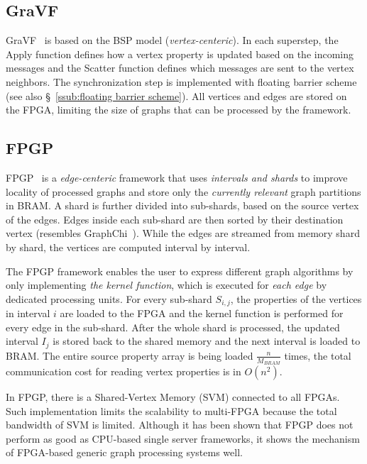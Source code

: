 \documentclass[UTF8,12pt,a4paper]{article}
\begin{document}
\subsection{GraVF}
GraVF~\cite{DBLP:conf/fpl/EngelhardtS16} is based on the BSP model (\textit{vertex-centeric}).
In each superstep,
the Apply function defines how a vertex property is updated based on the incoming messages
and the Scatter function defines which messages are sent to the vertex neighbors.
The synchronization step is implemented with floating barrier scheme
(see also \S~\ref{ssub:floating barrier scheme}).
All vertices and edges are stored on the FPGA,
limiting the size of graphs that can be processed by the framework.

\subsection{FPGP}
FPGP~\cite{DBLP:conf/fpga/DaiCWY16} is a \textit{edge-centeric} framework
that uses \textit{intervals and shards} to improve locality of processed graphs
and store only the \textit{currently relevant} graph partitions in BRAM.
A shard is further divided into sub-shards, based on the source vertex of the edges.
Edges inside each sub-shard are then sorted by their destination vertex
(resembles GraphChi~\cite{DBLP:conf/osdi/KyrolaBG12}).
While the edges are streamed from memory shard by shard,
the vertices are computed interval by interval.

The FPGP framework enables the user to express different graph algorithms
by only implementing \textit{the kernel function},
which is executed for \textit{each edge} by dedicated processing units.
For every sub-shard $S_{i,j}$,
the properties of the vertices in interval $i$ are loaded to the FPGA
and the kernel function is performed for every edge in the sub-shard.
After the whole shard is processed,
the updated interval $I_j$ is stored back to the shared memory
and the next interval is loaded to BRAM.
The entire source property array is being loaded $\frac{n}{M_{BRAM}}$ times,
the total communication cost for reading vertex properties is in $O(n^2)$.

In FPGP, there is a Shared-Vertex Memory (SVM) connected to all FPGAs.
Such implementation limits the scalability to multi-FPGA
because the total bandwidth of SVM is limited.
Although it has been shown that FPGP
does not perform as good as CPU-based single server frameworks,
it shows the mechanism of FPGA-based generic graph processing systems well.
\end{document}
